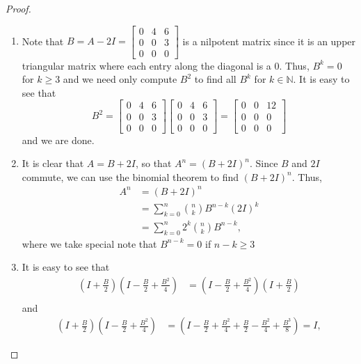 \documentclass[12pt]{article}
\theoremstyle{definition}
\begin{document}
\begin{proof}

 \begin{enumerate}
    \item Note that $B = A - 2I = \begin{bmatrix}0 & 4 & 6 \\ 0 & 0 & 3 \\ 0 & 0 & 0\end{bmatrix}$
      is a nilpotent matrix since it is an upper triangular matrix where each
      entry along the diagonal is a $0$. Thus, $B^k = 0$ for $k \geq 3$ and we
      need only compute $B^2$ to find all $B^k$ for $k \in \mathbb{N}$.
      It is easy to see that
      \[
        B^2 = \begin{bmatrix}0 & 4 & 6 \\ 0 & 0 & 3 \\ 0 & 0 & 0\end{bmatrix} \begin{bmatrix}0 & 4 & 6 \\ 0 & 0 & 3 \\ 0 & 0 & 0\end{bmatrix} = \begin{bmatrix}0 & 0 & 12 \\ 0 & 0 & 0 \\ 0 & 0 & 0\end{bmatrix}
      \]
      and we are done.
    \item It is clear that $A = B + 2I$, so that $A^n = (B + 2I)^n$. Since $B$ and
      $2I$ commute, we can use the binomial theorem to find $(B + 2I)^n$. Thus,
      \begin{align*}
        A^n
        &= (B + 2I)^n \\
        &= \sum_{k=0}^n {n \choose k} B^{n-k} (2I)^k \\
        &= \sum_{k=0}^n 2 ^k {n \choose k} B^{n-k},
      \end{align*}
      where we take special note that $B^{n-k} = 0$ if $n - k \geq 3$
    \item It is easy to see that
      \begin{align*}
        \left(I + \frac{B}{2}\right) \left(I - \frac{B}{2} + \frac{B^2}{4}\right)
        &= \left(I - \frac{B}{2} + \frac{B^2}{4}\right) \left(I + \frac{B}{2}\right) \\
      \end{align*}
      and
      \begin{align*}
        \left(I + \frac{B}{2}\right) \left(I - \frac{B}{2} + \frac{B^2}{4}\right) &= \left(I - \frac{B}{2} + \frac{B^2}{4} + \frac{B}{2} - \frac{B^2}{4} + \frac{B^3}{8}\right) = I,

\end{align*}
\end{enumerate}
\end{proof}
\end{document}
